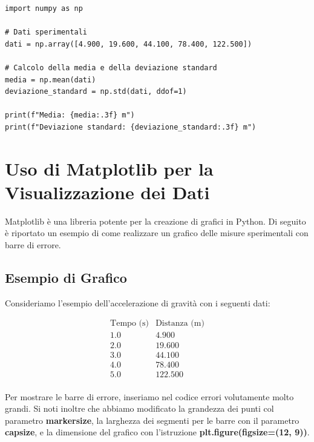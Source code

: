\documentclass[a4paper,12pt]{article}
\begin{document}
\begin{lstlisting}[caption={Calcolo della media e deviazione standard}]
import numpy as np

# Dati sperimentali
dati = np.array([4.900, 19.600, 44.100, 78.400, 122.500])

# Calcolo della media e della deviazione standard
media = np.mean(dati)
deviazione_standard = np.std(dati, ddof=1)

print(f"Media: {media:.3f} m")
print(f"Deviazione standard: {deviazione_standard:.3f} m")
\end{lstlisting}

\section{Uso di Matplotlib per la Visualizzazione dei Dati}

Matplotlib è una libreria potente per la creazione di grafici in Python. Di seguito è riportato un esempio di come realizzare un grafico delle misure sperimentali con barre di errore.

\subsection{Esempio di Grafico}

Consideriamo l'esempio dell'accelerazione di gravità con i seguenti dati:

\[
\begin{array}{c|c}
\text{Tempo (s)} & \text{Distanza (m)} \\
\hline
1.0 & 4.900 \\
2.0 & 19.600 \\
3.0 & 44.100 \\
4.0 & 78.400 \\
5.0 & 122.500 \\
\end{array}
\]

Per mostrare le barre di errore, inseriamo nel codice errori volutamente molto grandi. Si noti inoltre che abbiamo modificato la grandezza dei punti col parametro \textbf{markersize}, la larghezza dei segmenti per le barre con il parametro \textbf{capsize}, e la dimensione del grafico con l'istruzione \textbf{plt.figure(figsize=(12, 9))}.
\end{document}
